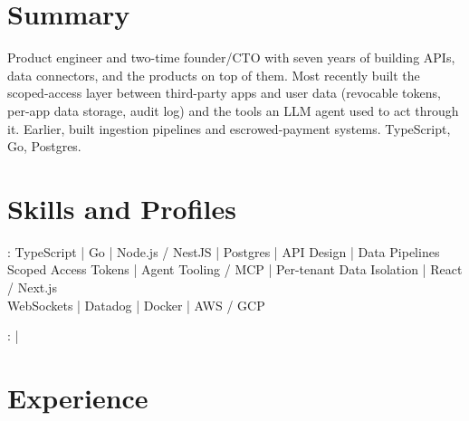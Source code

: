 \documentclass[print]{jack-resume}
\begin{document}
\pagecolor{darkmodeBackground}


\begin{minipage}[t][1cm][t]{.03\textwidth}
    \hfill
\end{minipage}

\section{Summary}
Product engineer and two-time founder/CTO with seven years of building APIs, data connectors, and the products on top of them. Most recently built the scoped-access layer between third-party apps and user data (revocable tokens, per-app data storage, audit log) and the tools an LLM agent used to act through it. Earlier, built ingestion pipelines and escrowed-payment systems. TypeScript, Go, Postgres.
\sectionsep

\section{Skills and Profiles}
:
TypeScript \hfill | \hfill
Go \hfill | \hfill
Node.js / NestJS \hfill | \hfill
Postgres \hfill | \hfill
API Design \hfill | \hfill
Data Pipelines \\
\hspace{1.0cm} Scoped Access Tokens \hfill | \hfill
Agent Tooling / MCP \hfill | \hfill
Per-tenant Data Isolation \hfill | \hfill
React / Next.js \\
\hspace{1.0cm} WebSockets \hfill | \hfill
Datadog \hfill | \hfill
Docker \hfill | \hfill
AWS / GCP \\

\raggedright{
    :
      \href{https://www.linkedin.com/in/jack-sturtevant/}{ \ExternalLink} |
     \href{https://github.com/jacksturt}{ \ExternalLink}}

\section{Experience}
\end{document}
